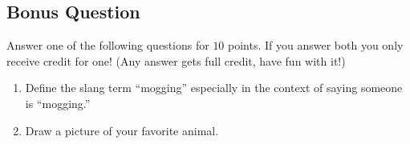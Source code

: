 \documentclass[12pt,addpoints]{exam}
\begin{document}
\begin{questions}
        \section*{Bonus Question}
        \question[10] Answer one of the following questions for $10$ points. If you answer both you
        only receive credit for one! (Any answer gets full credit, have fun with it!)
        \begin{enumerate}
            \item Define the slang term ``mogging'' especially in the context of saying someone
                is ``mogging.''
            \item Draw a picture of your favorite animal.
        \end{enumerate}
    \end{questions}
\end{document}

